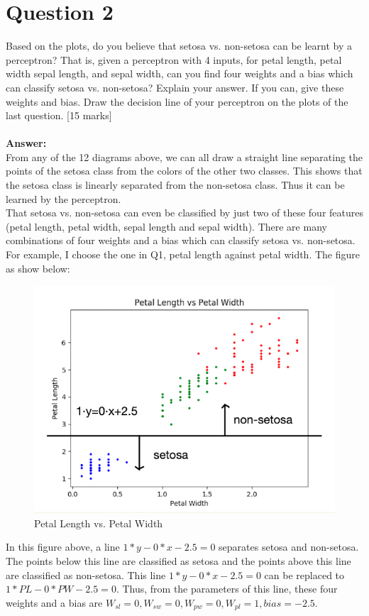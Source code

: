 \documentclass{article}
\begin{document}
\section{Question 2}
Based on the plots, do you believe that setosa vs. non-setosa can be learnt by a perceptron? That is, given a perceptron with 4 inputs, for petal length, petal width sepal length, and sepal width, can you find four weights and a bias which can classify setosa vs. non-setosa? Explain your answer. If you can, give these weights and bias. Draw the decision line of your perceptron on the plots of the last question.
[15 marks]\\\\
\textbf{Answer:}\\
From any of the 12 diagrams above, we can all draw a straight line separating the points of the setosa class from the colors of the other two classes. This shows that the setosa class is linearly separated from the non-setosa class. Thus it can be learned by the perceptron.\\
That setosa vs. non-setosa can even be classified by just two of these four features (petal length, petal width, sepal length and sepal width). There are many combinations of four weights and a bias which can classify setosa vs. non-setosa. For example, I choose the one in Q1, petal length against petal width. The figure as show below:\\
\begin{figure}[H]
\centering
\includegraphics[scale=0.4]{PLvsPW.png}
\caption{Petal Length vs. Petal Width}
\end{figure}
\noindent
In this figure above, a line $1*y-0*x-2.5=0$ separates setosa and non-setosa. The points below this line are classified as setosa and the points above this line are classified as non-setosa. This line $1*y-0*x-2.5=0$ can be replaced to $1*PL-0*PW-2.5=0$. Thus, from the parameters of this line, these four weights and a bias are $W_{sl}=0, W_{sw}=0, W_{pw}=0, W_{pl}=1, bias=-2.5$.
\end{document}
